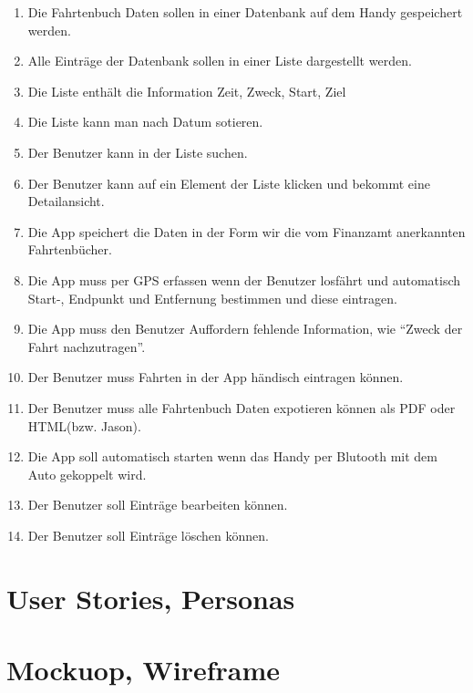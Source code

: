 \documentclass[a4paper]{article}
\begin{document}
\begin{enumerate}
	\item Die Fahrtenbuch Daten sollen in einer Datenbank auf dem Handy gespeichert werden.
	\item Alle Einträge der Datenbank sollen in einer Liste dargestellt werden.
	\item Die Liste enthält die Information Zeit, Zweck, Start, Ziel
	\item Die Liste kann man nach Datum sotieren.
	\item Der Benutzer kann in der Liste suchen.
	\item Der Benutzer kann auf ein Element der Liste klicken und bekommt eine Detailansicht.
	\item Die App speichert die Daten in der Form wir die vom Finanzamt anerkannten Fahrtenbücher.
	\item Die App muss per GPS erfassen wenn der Benutzer losfährt und automatisch Start-, Endpunkt und Entfernung bestimmen und diese eintragen.
	\item Die App muss den Benutzer Auffordern fehlende Information, wie \enquote{Zweck der Fahrt nachzutragen}.
	\item Der Benutzer muss Fahrten in der App händisch eintragen können.
	\item Der Benutzer muss alle Fahrtenbuch Daten expotieren können als PDF oder HTML(bzw. Jason).
	\item Die App soll automatisch starten wenn das Handy per Blutooth mit dem Auto gekoppelt wird.
	\item Der Benutzer soll Einträge bearbeiten können.
	\item Der Benutzer soll Einträge löschen können.
\end{enumerate}

\section{User Stories, Personas}

\section{Mockuop, Wireframe}
\end{document}
